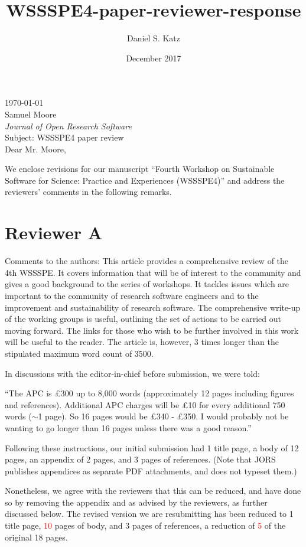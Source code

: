 \documentclass[11pt]{article}
\title{WSSSPE4-paper-reviewer-response}
\author{Daniel S. Katz}
\date{December 2017}
\begin{document}
\today\\

Samuel Moore\\
\textit{Journal of Open Research Software}\\

Subject: WSSSPE4 paper review\\

Dear Mr. Moore,

We enclose revisions for our manuscript ``Fourth Workshop on Sustainable Software for Science: Practice and Experiences
(WSSSPE4)'' and address the reviewers' comments in the following remarks.


\section*{Reviewer A}

\begin{quoting}
Comments to the authors: 
This article provides a comprehensive review of the 4th WSSSPE.  It covers information that will be of interest to the community and gives a good background to the series of workshops.  It tackles issues which are important to the community of research software engineers and to the improvement and sustainability of research software.
The comprehensive write-up of the working groups is useful, outlining the set of actions to be carried out moving forward. The links for those who wish to be further involved in this work will be useful to the reader.
The article is, however, 3 times longer than the stipulated maximum word count of 3500. 
\end{quoting}

In discussions with the editor-in-chief before submission, we were told:

``The APC is \pounds300 up to 8,000 words (approximately 12 pages including
figures and references). Additional APC charges will be \pounds10 for every
additional 750 words ($\sim$1 page).
So 16 pages would be \pounds340 - \pounds350. I would probably not be wanting to
go longer than 16 pages unless there was a good reason.''

Following these instructions, our initial submission had 1 title page, a body of 12 pages, an appendix of 2 pages, and 3 pages of references. (Note that JORS publishes appendices as separate PDF attachments, and does not typeset them.)

Nonetheless, we agree with the reviewers that this can be reduced, and have done so by removing the appendix and as advised by the reviewers, as further discussed below.  The revised version we are resubmitting has been reduced to 1 title page, \textcolor{red}{10} pages of body, and 3 pages of references, a reduction of \textcolor{red}{5} of the original 18 pages.
\end{document}
